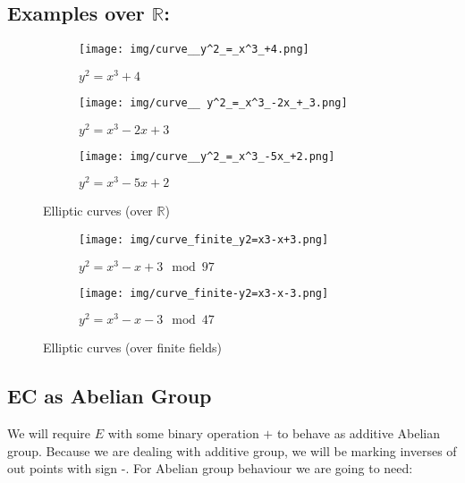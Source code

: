 \documentclass[bp,en]{FEIstyle}
\begin{document}
\subsection*{Examples over $\mathbb{R}$:}
\begin{figure}[H]
    \centering
    \begin{subfigure}{0.3\textwidth}
        \texttt{[image: img/curve\_\_y^2\_=\_x^3\_+4.png]}
        \caption{$y^2 = x^3 + 4$}
        \label{fig:example_curve_1}
    \end{subfigure}%
    \hfill %
    \begin{subfigure}{0.3\textwidth}
        \texttt{[image: img/curve\_\_ y^2\_=\_x^3\_-2x\_+\_3.png]}
        \caption{$y^2 = x^3 - 2x + 3$}
        \label{fig:example_curve_2}
    \end{subfigure}%
    \hfill %
    \begin{subfigure}{0.3\textwidth}
        \texttt{[image: img/curve\_\_y^2\_=\_x^3\_-5x\_+2.png]}
        \caption{$y^2 = x^3 - 5x + 2$}
        \label{fig:example_curve_3}
    \end{subfigure}
    \caption{Elliptic curves (over $\mathbb{R}$)}
    \label{fig:example_elliptic_curves_1}
\end{figure}

\begin{figure}[H]
    \centering
    \begin{subfigure}{0.35\textwidth}
        \texttt{[image: img/curve\_finite\_y2=x3-x+3.png]}
        \caption{$y^2=x^3-x+3 \mod 97$}
        \label{fig:example_curve_4}
    \end{subfigure}%
    \begin{subfigure}{0.338777\textwidth}
        \texttt{[image: img/curve\_finite-y2=x3-x-3.png]}
        \caption{$y^2=x^3-x-3 \mod 47$}
        \label{fig:example_curve_5}
    \end{subfigure}%
    \caption{Elliptic curves (over finite fields)}
    \label{fig:example_elliptic_curves_2}
\end{figure}

\subsection*{EC as Abelian Group}
We will require $E$ with some binary operation $+$ to behave as additive Abelian group. Because we are dealing with additive group, we will be marking inverses of out points with sign -. For Abelian group behaviour we are going to need:
\end{document}
